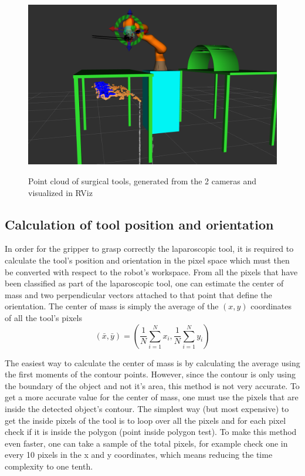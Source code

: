 \begin{center}
\begin{figure}[H]
\centering
\includegraphics[width=12cm]{images/point_cloud.png}\\
\caption{Point cloud of surgical tools, generated from the 2 cameras and visualized in RViz}
\end{figure}
\end{center}

\subsection{Calculation of tool position and orientation}

In order for the gripper to grasp correctly the laparoscopic tool, it is required to calculate the tool's position and orientation in the pixel space 
which must then be converted with respect to the robot's workspace. From all the pixels that have been classified as part of the laparoscopic tool, 
one can estimate the center of mass and two perpendicular vectors 
attached to that point that define the orientation. The center of mass is simply the average of the $(x,y)$ coordinates of all the tool's pixels
\[
\left( \bar{x}, \bar{y} \right) = \left( \frac{1}{N}\sum_{i=1}^{N} x_i , \frac{1}{N}\sum_{i=1}^{N} y_i \right)
\]

The easiest way to calculate the center of mass is by calculating the average using the first moments of the contour points. However, since the contour is only using
the boundary of the object and not it's area, this method is not very accurate. To get a more accurate value for the center of mass, one must use the pixels that are inside 
the detected object's contour. The simplest way (but most expensive) to get the inside pixels of the tool is to loop over all the pixels and for each pixel check if it is inside the 
polygon (point inside polygon test). To make this method even faster, one can take a sample of the total pixels, for example check one in every 10 pixels in the x and y coordinates, 
which means reducing the time complexity to one tenth. \\

